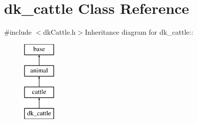 \hypertarget{classdk__cattle}{
\section{dk\_\-cattle Class Reference}
\label{classdk__cattle}
}


{\ttfamily \#include $<$dkCattle.h$>$}Inheritance diagram for dk\_\-cattle::\begin{figure}[H]
\begin{center}
\leavevmode
\includegraphics[height=4cm]{classdk__cattle}
\end{center}
\end{figure}
